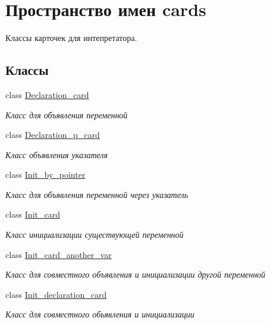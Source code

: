 \hypertarget{namespacecards}{}\section{Пространство имен cards}
\label{namespacecards}


Классы карточек для интепретатора.  


\subsection*{Классы}
\begin{DoxyCompactItemize}
\item 
class \mbox{\hyperlink{classcards_1_1_declaration__card}{Declaration\+\_\+card}}
\begin{DoxyCompactList}\small\item\em Класс для объявления переменной \end{DoxyCompactList}\item 
class \mbox{\hyperlink{classcards_1_1_declaration__p__card}{Declaration\+\_\+p\+\_\+card}}
\begin{DoxyCompactList}\small\item\em Класс объявления указателя \end{DoxyCompactList}\item 
class \mbox{\hyperlink{classcards_1_1_init__by__pointer}{Init\+\_\+by\+\_\+pointer}}
\begin{DoxyCompactList}\small\item\em Класс для объявления переменной через указатель \end{DoxyCompactList}\item 
class \mbox{\hyperlink{classcards_1_1_init__card}{Init\+\_\+card}}
\begin{DoxyCompactList}\small\item\em Класс инициализации существующей переменной \end{DoxyCompactList}\item 
class \mbox{\hyperlink{classcards_1_1_init__card__another__var}{Init\+\_\+card\+\_\+another\+\_\+var}}
\begin{DoxyCompactList}\small\item\em Класс для совместного объявления и инициализации другой переменной \end{DoxyCompactList}\item 
class \mbox{\hyperlink{classcards_1_1_init__declaration__card}{Init\+\_\+declaration\+\_\+card}}
\begin{DoxyCompactList}\small\item\em Класс для совместного обьявления и инициализации \end{DoxyCompactList}\item 

\end{DoxyCompactItemize}
